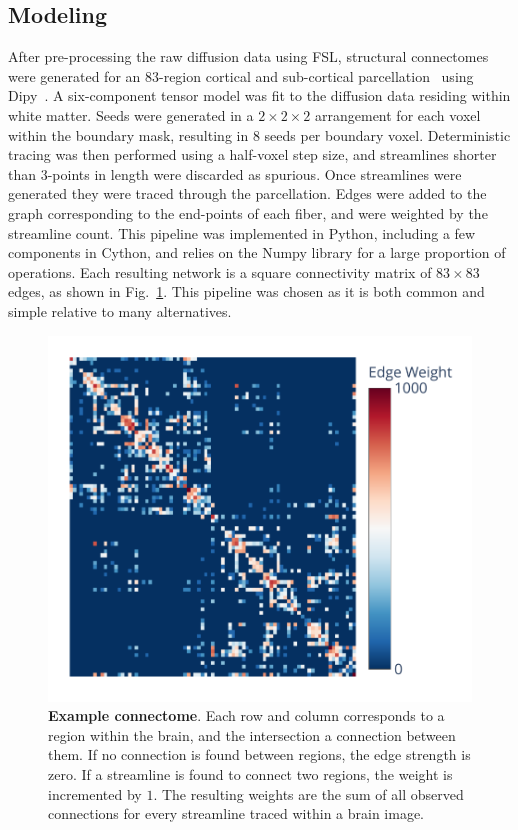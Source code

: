 \documentclass[fleqn,12pt]{SelfArx_ch} %
\begin{document}
\subsection{Modeling}\label{sec:modeling}
After pre-processing the raw diffusion data using FSL, structural connectomes were generated for an $83$-region
cortical and sub-cortical parcellation~\cite{Cammoun2012-yw} using Dipy~\cite{Garyfallidis2014-ql}. A
six-component tensor model was fit to the diffusion data residing within white matter. Seeds were generated in a
$2 \times 2 \times 2$ arrangement for each voxel within the boundary mask, resulting in 8 seeds per boundary voxel.
Deterministic tracing was then performed using a half-voxel step size, and streamlines shorter than $3$-points in
length were discarded as spurious. Once streamlines were generated they were traced through the parcellation. Edges
were added to the graph corresponding to the end-points of each fiber, and were weighted by the streamline count. This
pipeline was implemented in Python, including a few components in Cython, and relies on the Numpy library for a large
proportion of operations. Each resulting network is a square connectivity matrix of $83 \times 83$ edges, as shown in
Fig.~\ref{fig1:example}. This pipeline was chosen as it is both common and simple relative to many alternatives.

\begin{figure}[t!]
\centerline{\includegraphics[width=\linewidth]{figures/fig1_example_graph.pdf}}
\caption{\textbf{Example connectome}. Each row and column corresponds to a region
within the brain, and the intersection a connection between them. If no connection
is found between regions, the edge strength is zero. If a streamline is found to
connect two regions, the weight is incremented by $1$. The resulting weights are
the sum of all observed connections for every streamline traced within a brain image.}
\label{fig1:example}
\end{figure}
\end{document}
